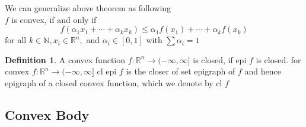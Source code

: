 \documentclass[oneside]{book}
\theoremstyle{definition}
\newtheorem{mydef}{Definition}[chapter]
\begin{document}
We can  generalize above theorem as following \\
$f$ is convex, if and only if
\begin{equation}
\label{eq41}
f\left(\alpha_{1} x_{1}+\cdots+\alpha_{k} x_{k}\right) \leq \alpha_{1} f\left(x_{1}\right)+\cdots+\alpha_{k} f\left(x_{k}\right)
\end{equation}
for all $k \in \mathbb{N}, x_{i} \in \mathbb{R}^{n},$ and $\alpha_{i} \in[0,1]$ with $\sum \alpha_{i}=1$



\begin{mydef}
 A convex function $f: \mathbb{R}^{n} \rightarrow(-\infty, \infty]$ is closed, if epi $f$ is closed.
for convex  $f: \mathbb{R}^{n} \rightarrow(-\infty, \infty]$   cl epi $f$ is the closer of set epigraph of $f$ and hence epigraph of a closed convex function, which we denote by cl $f$
\end{mydef}










\begin{comment}
\begin{mydef}
A function $f: \mathbb{R}^{n} \rightarrow(-\infty, \infty]$ is \textbf{positively homogeneous} of degree 1 if
$$
f(\alpha x)=\alpha f(x), \quad \text { for all } x \in \mathbb{R}^{n}, \alpha \geq 0
$$
$f$ is convex if and only if it is subadditive, given  $f$ is positively homogeneous  as
$$
 f(x+y) \leq f(x)+f(y)  \text{and }f(\alpha x)=\alpha f(x) $$,
  \quad \text { for all } R$ gives definition of convex function
\end{mydef}

\end{comment}








 \subsection{Convex Body}
 
\end{document}
